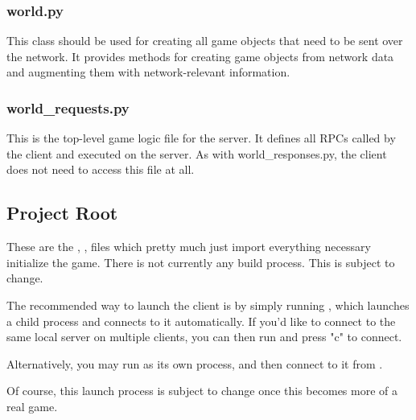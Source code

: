 \documentclass{article}
\begin{document}
\subsubsection{world.py}
This class should be used for creating all game objects that need to be sent over the
network. It provides methods for creating game objects from network data and augmenting
them with network-relevant information.
\subsubsection{world\_requests.py}
This is the top-level game logic file for the server. It defines all RPCs called by
the client and executed on the server. As with world\_responses.py, the client does not
need to access this file at all.
\subsection{Project Root}
These are the , , 
files which pretty much just import everything necessary initialize the game. 
There is not currently any build process. This is subject to change.

The recommended way to launch the client is by simply running , which
launches a child  process and connects to it automatically.
If you'd like to connect to the same local server on multiple clients, you can then run
 and press "c" to connect.

Alternatively, you may run  as its own process, and then connect
to it from .

Of course, this launch process is subject to change once this becomes more of a real game.
\end{document}
